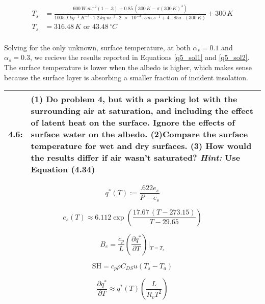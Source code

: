 \documentclass[12pt]{article}
\newcommand*{\problem}[2]{
    \begin{table}[ht]
    \centering
        \begin{tabular}{ | p{.1\linewidth} p{.9\linewidth} | }
            \hline
            \vspace{.3em}\textbf{\large#1:} & \vspace{.3em}\small{#2}\hspace{.2em}\vspace{.5em} \\ \hline
        \end{tabular}
    \end{table}
}
\begin{document}
\begin{equation}\label{q5_sol2}
    \begin{split}
        T_s &= \frac{600\,\si{W.m^{-2}}(1-.3)+0.85\,(300\,\si{K}-\sigma(300\,\si{K})^4)}{1005\,\si{J.kg^{-1}.K^{-1}}\cdot1.2\,\si{kg.m^{-3}}\cdot \num{2e-3} \cdot 5\,\si{m.s^{-1}} + 4\cdot .85\sigma\cdot(300\,\si{K})} + 300\,\si{K} \\
        T_s &= 316.48\,\si{K}\text{ or } 43.48 \,^\circ\si{C} \\
    \end{split}
\end{equation}

Solving for the only unknown, surface temperature, at both $\alpha_s = 0.1$ and $\alpha_s = 0.3$, we recieve the results reported in Equations \ref{q5_sol1} and \ref{q5_sol2}.
The surface temperature is lower when the albedo is higher, which makes sense because the surface layer is absorbing a smaller fraction of incident insolation.


\problem{4.6}{
    \textbf{(1)} Do problem 4, but with a parking lot with the surrounding air at saturation, and including the effect of latent heat on the surface.
    Ignore the effects of surface water on the albedo.
    \textbf{(2)}Compare the surface temperature for wet and dry surfaces.
    \textbf{(3)} How would the results differ if air wasn't saturated?
    \textit{Hint:} Use Equation (4.34)
    }%

\begin{equation}\label{mix_ratio}
    q^*(T) := \frac{.622 e_s}{P - e_s}
\end{equation}

\begin{equation}\label{bolton1980}
    e_s(T) \approx 6.112\exp\left(\frac{17.67\,(T-273.15)}{T-29.65}\right)
\end{equation}

\begin{equation}\label{bowen}
    B_e = \frac{c_p}{L} \left(\frac{\partial q^*}{\partial T} \right) |_{T=T_s}
\end{equation}

\begin{equation}\label{q6_sh}
    \text{SH} = c_p \rho C_{DS} u (T_s - T_a)
\end{equation}

\begin{equation}\label{dq_dT}
    \frac{\partial q^*}{\partial T} \approx q^*(T) \left(\frac{L}{R_vT^2}\right)
\end{equation}
\end{document}

